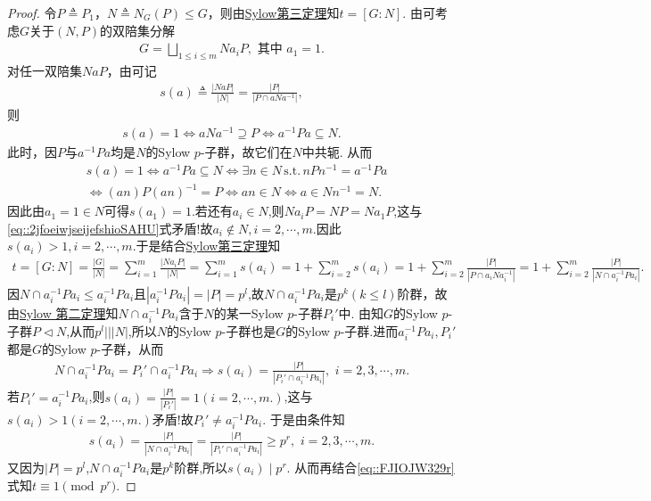 \documentclass[../../main.tex]{subfiles}%
\begin{document}
\begin{proof}
令$P\triangleq P_1$，$N\triangleq N_G(P)\leqslant G$，则由\hyperref[theorem:Sylow第三定理]{Sylow第三定理}知$t=[G:N]$. 由可考虑$G$关于$(N,P)$的双陪集分解
\begin{align}\label{eq::2jfoeiwjseijefshioSAHU}
G=\bigsqcup_{1\leqslant i\leqslant m} Na_iP, \text{ 其中 } a_1=1.
\end{align}
对任一双陪集$NaP$，由可记
\begin{align*}
s(a)\triangleq \frac{|NaP|}{|N|}=\frac{|P|}{|P\cap aNa^{-1}|},
\end{align*}
则
\begin{align*}
s(a)=1\iff aNa^{-1}\supseteq P\iff a^{-1}Pa\subseteq N.
\end{align*}
此时，因$P$与$a^{-1}Pa$均是$N$的Sylow $p$-子群，故它们在$N$中共轭. 从而
\begin{align*}
&s(a)=1\iff a^{-1}Pa\subseteq N\iff \exists n\in N\,\text{s.t.}\,nPn^{-1}=a^{-1}Pa
\\
&\iff (an)P(an)^{-1}=P\iff an\in N\iff a\in Nn^{-1}= N.
\end{align*}
因此由$a_1=1\in N$可得$s(a_1)=1$.若还有$a_i\in N$,则$Na_iP=NP=Na_1P$,这与\eqref{eq::2jfoeiwjseijefshioSAHU}式矛盾!故$a_i\notin N,i=2,\cdots,m$.因此$s(a_i)>1,i=2,\cdots,m$.于是结合\hyperref[theorem:Sylow第三定理]{Sylow第三定理}知
\begin{align}
t=[G:N]=\frac{\left| G \right|}{\left| N \right|}=\sum_{i=1}^m{\frac{|Na_iP|}{\left| N \right|}}=\sum_{i=1}^m{s\left( a_i \right)}=1+\sum_{i=2}^m{s\left( a_i \right)}=1+\sum_{i=2}^m{\frac{\left| P \right|}{\left| P\cap a_iNa_{i}^{-1} \right|}}=1+\sum_{i=2}^m{\frac{\left| P \right|}{\left| N\cap a_{i}^{-1}Pa_i \right|}}.\label{eq::FJIOJW329r}
\end{align}
因$N\cap a_i^{-1}Pa_i\leqslant a_i^{-1}Pa_i$且$|a_i^{-1}Pa_i|=|P|=p^l$,故$N\cap a_i^{-1}Pa_i$是$p^k(k\leqslant l)$阶群，故由\hyperref[theorem:Sylow 第二定理]{Sylow 第二定理}知$N\cap a_i^{-1}Pa_i$含于$N$的某一Sylow $p$-子群$P_i'$中. 由知$G$的Sylow $p$-子群$P\lhd N$,从而$p^l|||N|$,所以$N$的Sylow $p$-子群也是$G$的Sylow $p$-子群.进而$a_i^{-1}Pa_i,P_i'$都是$G$的Sylow $p$-子群，从而
\begin{align*}
N\cap a_i^{-1}Pa_i=P_i'\cap a_i^{-1}Pa_i\Longrightarrow s(a_i)=\frac{\left| P \right|}{\left| P_i'\cap a_i^{-1}Pa_i \right|},\,\,i=2,3,\cdots,m.
\end{align*}
若$P_i'=a_i^{-1}Pa_i$,则$s(a_i)=\frac{|P|}{|P_i'|}=1(i=2,\cdots,m.)$,这与$s(a_i)>1(i=2,\cdots,m.)$矛盾!故$P_i'\neq a_i^{-1}Pa_i$.
于是由条件知
\begin{align*}
s(a_i)=\frac{|P|}{|N\cap a_i^{-1}Pa_i|}=\frac{\left| P \right|}{\left| P_i'\cap a_i^{-1}Pa_i \right|}\geqslant p^r,\,\,i=2,3,\cdots,m.
\end{align*}
又因为$|P|=p^l$,$N\cap a_i^{-1}Pa_i$是$p^k$阶群,所以$s(a_i)\mid p^r$.
从而再结合\eqref{eq::FJIOJW329r}式知$t\equiv 1\pmod{p^r}$.
\end{proof}
\end{document}
